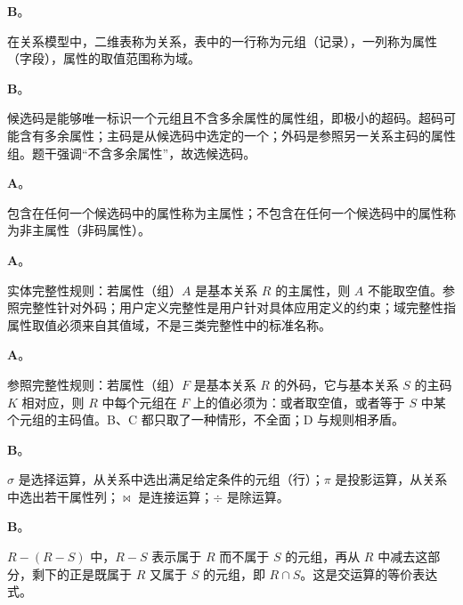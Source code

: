 \documentclass[a4paper,11pt]{article}
\begin{document}


\q \textbf{B}。\begin{analysis}在关系模型中，二维表称为关系，表中的一行称为元组（记录），一列称为属性（字段），属性的取值范围称为域。\end{analysis}

\q \textbf{B}。\begin{analysis}候选码是能够唯一标识一个元组且不含多余属性的属性组，即极小的超码。超码可能含有多余属性；主码是从候选码中选定的一个；外码是参照另一关系主码的属性组。题干强调“不含多余属性”，故选候选码。\end{analysis}

\q \textbf{A}。\begin{analysis}包含在任何一个候选码中的属性称为主属性；不包含在任何一个候选码中的属性称为非主属性（非码属性）。\end{analysis}

\q \textbf{A}。\begin{analysis}实体完整性规则：若属性（组）$A$ 是基本关系 $R$ 的主属性，则 $A$ 不能取空值。参照完整性针对外码；用户定义完整性是用户针对具体应用定义的约束；域完整性指属性取值必须来自其值域，不是三类完整性中的标准名称。\end{analysis}

\q \textbf{A}。\begin{analysis}参照完整性规则：若属性（组）$F$ 是基本关系 $R$ 的外码，它与基本关系 $S$ 的主码 $K$ 相对应，则 $R$ 中每个元组在 $F$ 上的值必须为：或者取空值，或者等于 $S$ 中某个元组的主码值。B、C 都只取了一种情形，不全面；D 与规则相矛盾。\end{analysis}

\q \textbf{B}。\begin{analysis}$\sigma$ 是选择运算，从关系中选出满足给定条件的元组（行）；$\pi$ 是投影运算，从关系中选出若干属性列；$\bowtie$ 是连接运算；$\div$ 是除运算。\end{analysis}

\q \textbf{B}。\begin{analysis}$R-(R-S)$ 中，$R-S$ 表示属于 $R$ 而不属于 $S$ 的元组，再从 $R$ 中减去这部分，剩下的正是既属于 $R$ 又属于 $S$ 的元组，即 $R\cap S$。这是交运算的等价表达式。\end{analysis}
\end{document}
